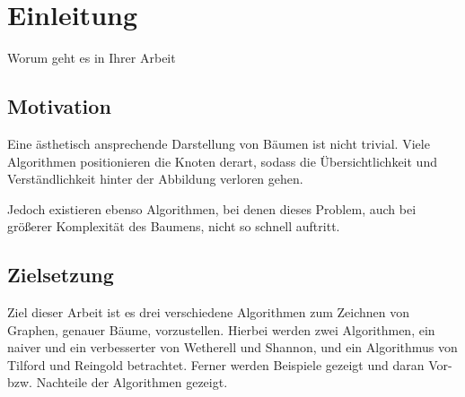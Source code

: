 \chapter{Einleitung}
\label{chap:einleitung}
Worum geht es in Ihrer Arbeit

\section{Motivation}
\label{sec:motivation}
Eine ästhetisch ansprechende Darstellung von Bäumen ist nicht trivial.
Viele Algorithmen positionieren die Knoten derart, sodass die Übersichtlichkeit
und Verständlichkeit hinter der Abbildung verloren gehen.

Jedoch existieren ebenso Algorithmen, bei denen dieses Problem, auch bei größerer
Komplexität des Baumens, nicht so schnell auftritt.

\section{Zielsetzung}
\label{sec:zielsetzung}
Ziel dieser Arbeit ist es drei verschiedene Algorithmen zum Zeichnen von
Graphen, genauer Bäume, vorzustellen. Hierbei werden zwei Algorithmen, ein naiver
und ein verbesserter von Wetherell und Shannon, und ein Algorithmus von
Tilford und Reingold betrachtet. Ferner werden Beispiele gezeigt und daran
Vor- bzw. Nachteile der Algorithmen gezeigt.
